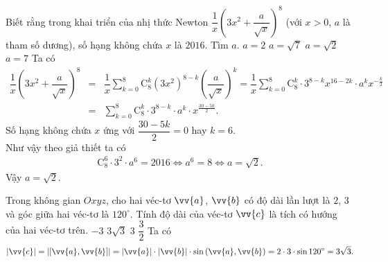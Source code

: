 \documentclass[12pt,a4paper,oneside]{book}
\def\vec{\vv}
\begin{document}
\begin{ex}%
	Biết rằng trong khai triển của nhị thức Newton $\dfrac{1}{x}\left(3x^2+\dfrac{a}{\sqrt{x}}\right)^8$ (với $x>0$, $a$ là tham số dương), số hạng không chứa $x$ là $2016$. Tìm $a$.
	\choice
	{$a=2$}
	{$a=\sqrt{7}$}
	{\True $a=\sqrt{2}$}
	{$a=7$}
	\loigiai
	{
		Ta có
		\begin{eqnarray*}
			\dfrac{1}{x}\left(3x^2+\dfrac{a}{\sqrt{x}}\right)^8 &=& \dfrac{1}{x}\sum\limits_{k=0}^{8}\mathrm{C}_8^k (3x^2)^{8-k}\left(\dfrac{a}{\sqrt{x}}\right)^k = \dfrac{1}{x} \sum\limits_{k=0}^{8}\mathrm{C}_8^k \cdot 3^{8-k}x^{16-2k}\cdot a^k x^{-\frac{k}{2}} \\
			&=& \sum\limits_{k=0}^{8}\mathrm{C}_8^k \cdot 3^{8-k} \cdot a^k \cdot x^{\frac{30-5k}{2}}.
		\end{eqnarray*}
		Số hạng không chứa $x$ ứng với $\dfrac{30-5k}{2}=0$ hay $k=6$.\\
		Như vậy theo giả thiết ta có
		\begin{eqnarray*}
			\mathrm{C}_8^6 \cdot 3^2 \cdot a^6 = 2016 \Leftrightarrow a^6=8 \Leftrightarrow a=\sqrt{2}.
		\end{eqnarray*}
		Vậy $a=\sqrt{2}$.
	}
\end{ex}
\begin{ex}%
	Trong không gian $Oxyz$, cho hai véc-tơ $\vec{a}$, $\vec{b}$ có độ dài lần lượt là $2$, $3$ và góc giữa hai véc-tơ là $120^\circ$. Tính độ dài của véc-tơ $\vec{c}$ là tích có hướng của hai véc-tơ trên.
	\choice
	{$-3$}
	{\True $3\sqrt{3}$}
	{$3$}
	{$\dfrac{3}{2}$}
	\loigiai
	{
		Ta có
		\begin{eqnarray*}
			\left|\vec{c}\right|= \left|\left[\vec{a},\vec{b}\right]\right|=\left|\vec{a}\right|\cdot \left|\vec{b}\right|\cdot \sin \left(\vec{a},\vec{b}\right) = 2 \cdot 3 \cdot \sin 120^\circ = 3\sqrt{3}.
		\end{eqnarray*}
	}
\end{ex}
\end{document}
